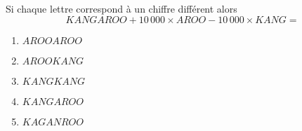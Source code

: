 Si chaque lettre correspond à un chiffre différent alors
\[KANGAROO+10\,000\times AROO-10\,000\times KANG=\]
\begin{multicols}{5}
  \begin{enumerate}[A/]
  \item $AROOAROO$
  \item $AROOKANG$
  \item $KANGKANG$
  \item $KANGAROO$
  \item $KAGANROO$
  \end{enumerate}
\end{multicols}